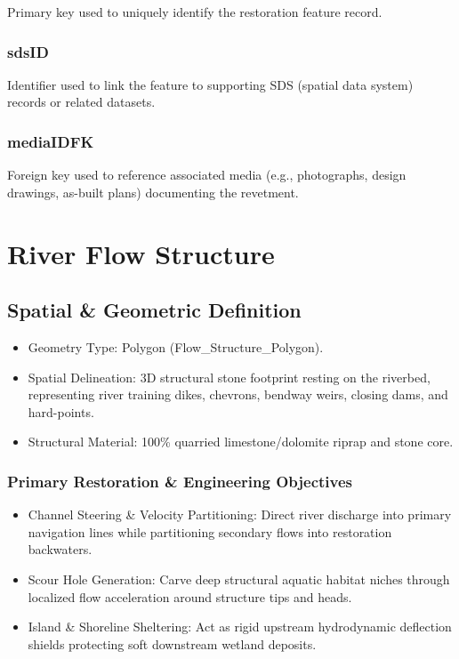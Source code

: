 \documentclass[
  letterpaper,
  DIV=11,
  numbers=noendperiod]{scrreprt}
\begin{document}
Primary key used to uniquely identify the restoration feature record.

\subsection{sdsID}\label{sdsid-11}

Identifier used to link the feature to supporting SDS (spatial data
system) records or related datasets.

\subsection{mediaIDFK}\label{mediaidfk-11}

Foreign key used to reference associated media (e.g., photographs,
design drawings, as-built plans) documenting the revetment.

\chapter{River Flow Structure}\label{river-flow-structure}

\section{Spatial \& Geometric
Definition}\label{spatial-geometric-definition-12}

\begin{itemize}
\item
  Geometry Type: Polygon (Flow\_Structure\_Polygon).
\item
  Spatial Delineation: 3D structural stone footprint resting on the
  riverbed, representing river training dikes, chevrons, bendway weirs,
  closing dams, and hard-points.
\item
  Structural Material: 100\% quarried limestone/dolomite riprap and
  stone core.
\end{itemize}

\subsection{Primary Restoration \& Engineering
Objectives}\label{primary-restoration-engineering-objectives-11}

\begin{itemize}
\item
  Channel Steering \& Velocity Partitioning: Direct river discharge into
  primary navigation lines while partitioning secondary flows into
  restoration backwaters.
\item
  Scour Hole Generation: Carve deep structural aquatic habitat niches
  through localized flow acceleration around structure tips and heads.
\item
  Island \& Shoreline Sheltering: Act as rigid upstream hydrodynamic
  deflection shields protecting soft downstream wetland deposits.
\end{itemize}
\end{document}
